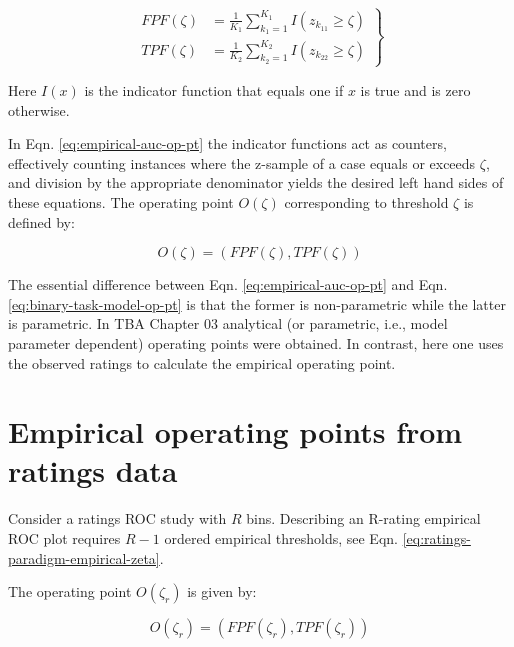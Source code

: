 \documentclass[
]{book}
\begin{document}
\begin{equation}
\left.
\begin{aligned}
FPF\left ( \zeta \right ) &= \frac{1}{K_1}\sum_{k_1=1}^{K_1}I\left ( z_{k_11} \geq \zeta \right ) \\
TPF\left ( \zeta \right ) &= \frac{1}{K_2}\sum_{k_2=1}^{K_2}I\left ( z_{k_22} \geq \zeta \right )
\end{aligned}
\right \}
\label{eq:empirical-auc-op-pt}
\end{equation}

Here \(I(x)\) is the indicator function that equals one if \(x\) is true and is zero otherwise.

In Eqn. \eqref{eq:empirical-auc-op-pt} the indicator functions act as counters, effectively counting instances where the z-sample of a case equals or exceeds \(\zeta\), and division by the appropriate denominator yields the desired left hand sides of these equations. The operating point \(O(\zeta)\) corresponding to threshold \(\zeta\) is defined by:

\begin{equation}
O\left ( \zeta \right ) = \left ( FPF\left ( \zeta \right ), TPF\left ( \zeta \right ) \right )
\label{eq:empirical-OperatingPoint}
\end{equation}

The essential difference between Eqn. \eqref{eq:empirical-auc-op-pt} and Eqn. \eqref{eq:binary-task-model-op-pt} is that the former is non-parametric while the latter is parametric. In TBA Chapter 03 analytical (or parametric, i.e., model parameter dependent) operating points were obtained. In contrast, here one uses the observed ratings to calculate the empirical operating point.

\hypertarget{empirical-auc-operating-points}{%
\section{Empirical operating points from ratings data}\label{empirical-auc-operating-points}}

Consider a ratings ROC study with \(R\) bins. Describing an R-rating empirical ROC plot requires \(R-1\) ordered empirical thresholds, see Eqn. \eqref{eq:ratings-paradigm-empirical-zeta}.

The operating point \(O(\zeta_r)\) is given by:

\begin{equation}
O\left ( \zeta_r \right ) = \left ( FPF\left ( \zeta_r \right ), TPF\left ( \zeta_r \right ) \right )
\label{eq:empirical-operating-point-zeta-r}
\end{equation}
\end{document}
